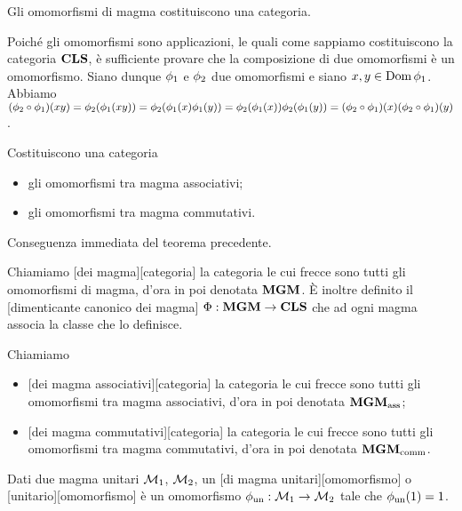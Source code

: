 \begin{Theorem}
	Gli omomorfismi di magma costituiscono una categoria.
\end{Theorem}
\Proof Poich\'e gli omomorfismi sono applicazioni, le quali come sappiamo costituiscono la categoria $\mathbf{CLS}$, \`e sufficiente provare che la composizione di due omomorfismi \`e un omomorfismo. Siano dunque $\phi_1$ e $\phi_2$ due omomorfismi e siano $x, y \in \operatorname{Dom}{\phi_1}$. Abbiamo $(\phi_2 \circ \phi_1)(xy) = \phi_2(\phi_1(xy)) = \phi_2(\phi_1(x) \phi_1(y)) = \phi_2(\phi_1(x)) \phi_2(\phi_1(y)) = (\phi_2 \circ \phi_1)(x) (\phi_2 \circ \phi_1)(y)$. \EndProof
\begin{Corollary}
	Costituiscono una categoria
	\begin{itemize}
		\item gli omomorfismi tra magma associativi;
		\item gli omomorfismi tra magma commutativi.
	\end{itemize}
\end{Corollary}
\Proof Conseguenza immediata del teorema precedente. \EndProof
\begin{Definition}
	Chiamiamo [dei magma][categoria] la categoria le cui frecce sono tutti gli omomorfismi di magma, d'ora in poi denotata $\mathbf{MGM}$. \`E inoltre definito il [dimenticante canonico dei magma] $\Phi: \mathbf{MGM} \rightarrow \mathbf{CLS}$ che ad ogni magma associa la classe che lo definisce.
\end{Definition}
\begin{Definition}
	Chiamiamo
	\begin{itemize}
		\item {}[dei magma associativi][categoria] la categoria le cui frecce sono tutti gli omomorfismi tra magma associativi, d'ora in poi denotata $\mathbf{MGM}_{\text{ass}}$;
		\item {}[dei magma commutativi][categoria] la categoria le cui frecce sono tutti gli omomorfismi tra magma commutativi, d'ora in poi denotata $\mathbf{MGM}_{\text{comm}}$.
	\end{itemize}
\end{Definition}
\begin{Definition}
	Dati due magma unitari $\mathcal{M}_1$, $\mathcal{M}_2$, un [di magma unitari][omomorfismo] o [unitario][omomorfismo] \`e un omomorfismo ${\phi_{\text{un}}}: \mathcal{M}_1 \rightarrow \mathcal{M}_2$ tale che ${\phi_{\text{un}}}(1) = 1$.
\end{Definition}
